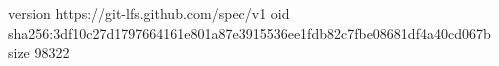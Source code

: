 version https://git-lfs.github.com/spec/v1
oid sha256:3df10c27d1797664161e801a87e3915536ee1fdb82c7fbe08681df4a40cd067b
size 98322
